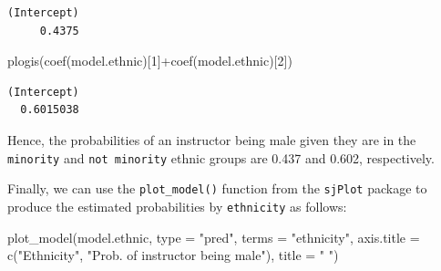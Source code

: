 \documentclass[
  letterpaper,
  DIV=11,
  numbers=noendperiod]{scrartcl}
\newenvironment{Shaded}{\begin{snugshade}}{\end{snugshade}}
\newcommand{\AttributeTok}[1]{\textcolor[rgb]{0.40,0.45,0.13}{#1}}
\newcommand{\DecValTok}[1]{\textcolor[rgb]{0.68,0.00,0.00}{#1}}
\newcommand{\FunctionTok}[1]{\textcolor[rgb]{0.28,0.35,0.67}{#1}}
\newcommand{\NormalTok}[1]{\textcolor[rgb]{0.00,0.23,0.31}{#1}}
\newcommand{\SpecialCharTok}[1]{\textcolor[rgb]{0.37,0.37,0.37}{#1}}
\newcommand{\StringTok}[1]{\textcolor[rgb]{0.13,0.47,0.30}{#1}}
\begin{document}
\begin{verbatim}
(Intercept) 
     0.4375 
\end{verbatim}

\begin{Shaded}
\begin{Highlighting}[]
\FunctionTok{plogis}\NormalTok{(}\FunctionTok{coef}\NormalTok{(model.ethnic)[}\DecValTok{1}\NormalTok{]}\SpecialCharTok{+}\FunctionTok{coef}\NormalTok{(model.ethnic)[}\DecValTok{2}\NormalTok{])}
\end{Highlighting}
\end{Shaded}

\begin{verbatim}
(Intercept) 
  0.6015038 
\end{verbatim}

Hence, the probabilities of an instructor being male given they are in
the \texttt{minority} and \texttt{not\ minority} ethnic groups are 0.437
and 0.602, respectively.

Finally, we can use the \texttt{plot\_model()} function from the
\texttt{sjPlot} package to produce the estimated probabilities by
\texttt{ethnicity} as follows:

\begin{Shaded}
\begin{Highlighting}[]
\FunctionTok{plot\_model}\NormalTok{(model.ethnic,}
           \AttributeTok{type =} \StringTok{"pred"}\NormalTok{,}
           \AttributeTok{terms =} \StringTok{"ethnicity"}\NormalTok{,}
           \AttributeTok{axis.title =} \FunctionTok{c}\NormalTok{(}\StringTok{"Ethnicity"}\NormalTok{, }
                          \StringTok{"Prob. of instructor being male"}\NormalTok{),}
           \AttributeTok{title =} \StringTok{" "}\NormalTok{)}
\end{Highlighting}
\end{Shaded}
\end{document}
